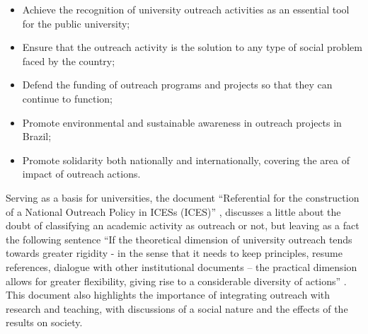 \begin{itemize}
    \item Achieve the recognition of university outreach activities as an essential tool for the public university;
    \item Ensure that the outreach activity is the solution to any type of social problem faced by the country;
    \item Defend the funding of outreach programs and projects so that they can continue to function;
    \item Promote environmental and sustainable awareness in outreach projects in Brazil;
    \item Promote solidarity both nationally and internationally, covering the area of impact of outreach actions.
\end{itemize}


Serving as a basis for universities, the document ``Referential for the construction of a National Outreach Policy in \aclp{ICES} (\ac{ICES})'' \cite{referenciaisPolitica},
discusses a little about the doubt of classifying an academic activity as outreach or not, but leaving as a fact the following sentence ``If the theoretical dimension of university outreach tends towards greater rigidity - in the sense that it needs to keep principles, resume references,
dialogue with other institutional documents – the practical dimension allows for greater flexibility, giving rise to a considerable diversity of actions'' \cite[p.43]{referenciaisPolitica}.
This document also highlights the importance of integrating outreach with research and teaching, with discussions of a social nature and the effects of the results on society.

